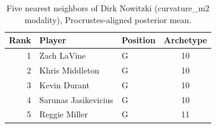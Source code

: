 \begin{table}[htbp]
  \centering\small
  \begin{tabular}{rllc}
    \toprule
    Rank & Player & Position & Archetype \\
    \midrule
    1 & Zach LaVine & G & 10 \\
    2 & Khris Middleton & G & 10 \\
    3 & Kevin Durant & G & 10 \\
    4 & Sarunas Jasikevicius & G & 10 \\
    5 & Reggie Miller & G & 11 \\
    \bottomrule
  \end{tabular}
  \caption{Five nearest neighbors of Dirk Nowitzki (curvature_m2 modality), Procrustes-aligned posterior mean.}
  \label{tab:Dirk_Nowitzki_neighbors_curvature_m2}
\end{table}

